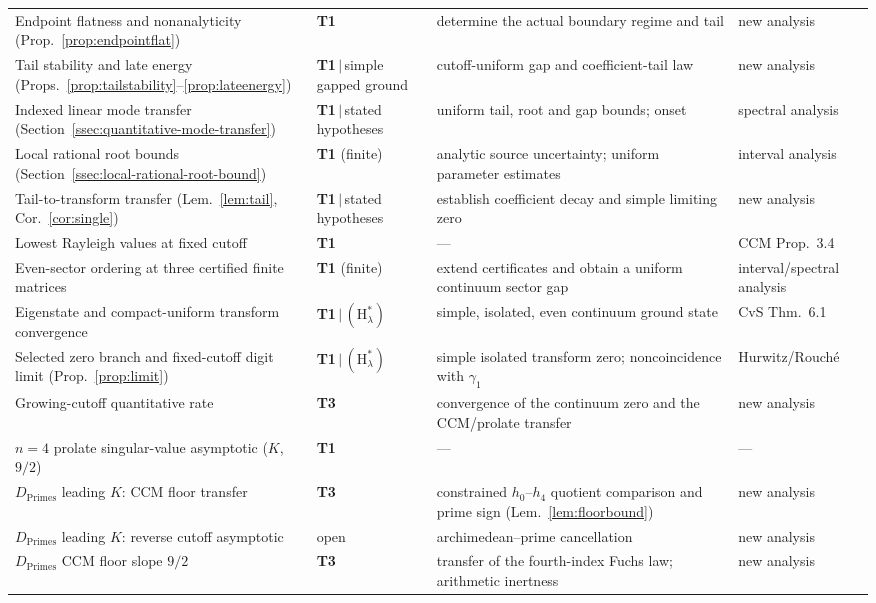 \documentclass[11pt,a4paper]{article}
\begin{document}
{\begin{longtable}{@{}p{4.6cm} p{2.7cm} p{4.6cm} p{2.4cm}@{}}
Endpoint flatness and nonanalyticity (Prop.~\ref{prop:endpointflat}) & \textbf{T1} & determine the actual boundary regime and tail & new analysis \\
Tail stability and late energy (Props.~\ref{prop:tailstability}--\ref{prop:lateenergy}) & \textbf{T1}$\,|\,$simple gapped ground & cutoff-uniform gap and coefficient-tail law & new analysis \\
Indexed linear mode transfer (Section~\ref{ssec:quantitative-mode-transfer}) & \textbf{T1}$\,|\,$stated hypotheses & uniform tail, root and gap bounds; onset & spectral analysis \\
Local rational root bounds (Section~\ref{ssec:local-rational-root-bound}) & \textbf{T1} (finite) & analytic source uncertainty; uniform parameter estimates & interval analysis \\
Tail-to-transform transfer (Lem.~\ref{lem:tail}, Cor.~\ref{cor:single}) & \textbf{T1}$\,|\,$stated hypotheses & establish coefficient decay and simple limiting zero & new analysis \\
Lowest Rayleigh values at fixed cutoff & \textbf{T1} & --- & CCM Prop.~3.4 \\
Even-sector ordering at three certified finite matrices & \textbf{T1} (finite) & extend certificates and obtain a uniform continuum sector gap & interval/spectral analysis \\
Eigenstate and compact-uniform transform convergence & \textbf{T1}$\,|\,(\mathrm{H}_\lambda^\ast)$ & simple, isolated, even continuum ground state & CvS Thm.~6.1 \\
Selected zero branch and fixed-cutoff digit limit (Prop.~\ref{prop:limit}) & \textbf{T1}$\,|\,(\mathrm{H}_\lambda^\ast)$ & simple isolated transform zero; noncoincidence with $\gamma_1$ & Hurwitz/Rouch\'e \\
Growing-cutoff quantitative rate & \textbf{T3} & convergence of the continuum zero and the CCM/prolate transfer & new analysis \\
$n=4$ prolate singular-value asymptotic ($K$, $9/2$) & \textbf{T1} & --- & --- \\
$D_{\mathrm{Primes}}$ leading $K$: CCM floor transfer & \textbf{T3} & constrained $h_0$--$h_4$ quotient comparison and prime sign (Lem.~\ref{lem:floorbound}) & new analysis \\
$D_{\mathrm{Primes}}$ leading $K$: reverse cutoff asymptotic & open & archimedean--prime cancellation & new analysis \\
$D_{\mathrm{Primes}}$ CCM floor slope $9/2$ & \textbf{T3} & transfer of the fourth-index Fuchs law; arithmetic inertness & new analysis \\

\end{longtable}}
\end{document}
